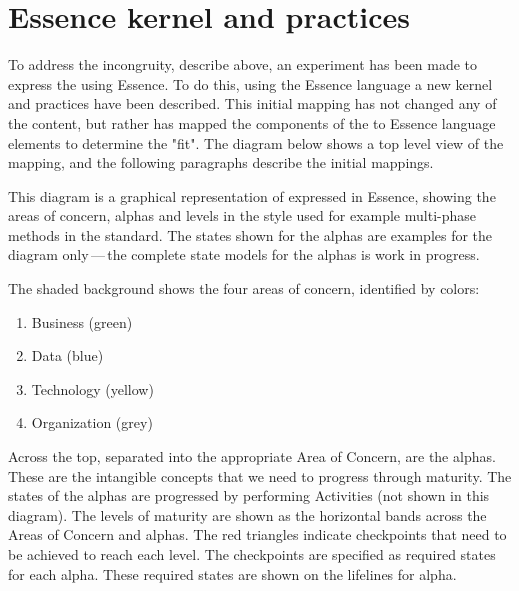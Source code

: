\section{ Essence kernel and practices}\label{subsec:ekg-mm-essence-kernel-and-practices}

To address the incongruity, describe above, an experiment has been made to express the 
using Essence.
To do this, using the Essence language a new kernel and practices have been described.
This initial mapping has not changed any of the content, but rather has mapped the components of
the  to Essence language elements to determine the "fit".
The diagram below shows a top level view of the mapping, and the following paragraphs describe the initial mappings.


This diagram is a graphical representation of  expressed in Essence,
showing the areas of concern, alphas and levels in the style used for example multi-phase methods
in the  standard.
The states shown for the alphas are examples for the diagram only\,---\,the complete state models for the alphas
is work in progress.

The shaded background shows the four areas of concern, identified by colors:

\begin{enumerate}
    \item Business (green)
    \item Data (blue)
    \item Technology (yellow)
    \item Organization (grey)
\end{enumerate}

Across the top, separated into the appropriate Area of Concern, are the alphas.
These are the intangible concepts that we need to progress through maturity.
The states of the alphas are progressed by performing Activities (not shown in this diagram).
The levels of maturity are shown as the horizontal bands across the Areas of Concern and alphas.
The red triangles indicate checkpoints that need to be achieved to reach each level.
The checkpoints are specified as required states for each alpha.
These required states are shown on the lifelines for alpha.

